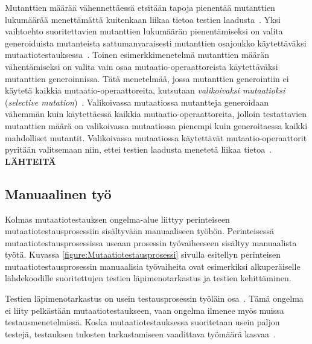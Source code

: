 \documentclass[finnish, grading]{tktltiki2}
\theoremstyle{definition}
\theoremstyle{remark}
\begin{document}
Mutanttien määrää vähennettäessä etsitään tapoja pienentää mutanttien lukumäärää menettämättä kuitenkaan liikaa tietoa testien laadusta~\cite[s. 37]{Offutt:Untch:2001}. Yksi vaihtoehto suoritettavien mutanttien lukumäärän pienentämiseksi on valita generoiduista mutanteista sattumanvaraisesti mutanttien osajoukko käytettäväksi mutaatiotestauksessa~\cite[s. 37]{Offutt:Untch:2001}. Toinen esimerkkimenetelmä mutanttien määrän vähentämiseksi on valita vain osaa mutaatio-operaattoreista käytettäväksi mutanttien generoinnissa. Tätä menetelmää, jossa mutanttien generointiin ei käytetä kaikkia mutaatio-operaattoreita, kutsutaan \textit{valikoivaksi mutaatioksi} (\textit{selective mutation})~\cite[s. 37]{Offutt:Untch:2001}. Valikoivassa mutaatiossa mutantteja generoidaan vähemmän kuin käytettäessä kaikkia mutaatio-operaattoreita, jolloin testattavien mutanttien määrä on valikoivassa mutaatiossa pienempi kuin generoitaessa kaikki mahdolliset mutantit. Valikoivassa mutaatiossa käytettävät mutaatio-operaattorit pyritään valitsemaan niin, ettei testien laadusta menetetä liikaa tietoa~\cite[s. 654]{Jia:Harman:2011}. \textbf{LÄHTEITÄ} 

\subsection{Manuaalinen työ}

Kolmas mutaatiotestauksen ongelma-alue liittyy perinteiseen mutaatiotestausprosessiin sisältyvään manuaaliseen työhön. Perinteisessä mutaatiotestausprosessissa useaan prosessin työvaiheeseen sisältyy manuaalista työtä. Kuvassa \ref{figure:Mutaatiotestausprosessi} sivulla \pageref{figure:Mutaatiotestausprosessi} esitellyn perinteisen mutaatiotestausprosessin manuaalisia työvaiheita ovat esimerkiksi alkuperäiselle lähdekoodille suoritettujen testien läpimenotarkastus ja testien kehittäminen.

Testien läpimenotarkastus on usein testausprosessin työläin osa~\cite[s. 653]{Jia:Harman:2011}. Tämä ongelma ei liity pelkästään mutaatiotestaukseen, vaan ongelma ilmenee myös muissa testausmenetelmissä. Koska mutaatiotestauksessa suoritetaan usein paljon testejä, testauksen tulosten tarkastamiseen vaadittava työmäärä kasvaa~\cite[s. 653]{Jia:Harman:2011}.
\end{document}
